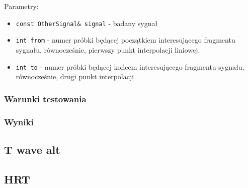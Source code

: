 \documentclass[a4paper, 11pt]{article}
\begin{document}
Parametry:
\begin{itemize}
  \item \verb|const OtherSignal& signal| - badany sygnał
  \item \verb|int from| - numer próbki będącej początkiem interesującego
    fragmentu sygnału, równocześnie, pierwszy punkt interpolacji liniowej.
  \item \verb|int to| - numer próbki będącej końcem interesującego fragmentu
    sygnału, równocześnie, drugi punkt interpolacji
\end{itemize}

\subsubsection{Warunki testowania}
\label{sec:st_interval:tests}

\subsubsection{Wyniki}
\label{sec:st_interval:results}

\subsection{T wave alt}
\label{sec:t_wave_alt}

\subsection{HRT}
\label{sec:hrt}



\end{document}
